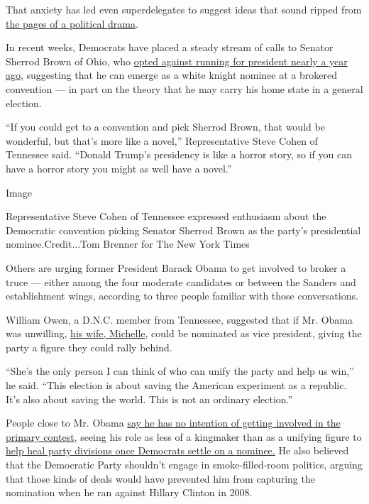 That anxiety has led even superdelegates to suggest ideas that sound
ripped from
\href{https://www.nytimes3xbfgragh.onion/2019/12/29/us/politics/west-wing-politics.html}{the
pages of a political drama}.

In recent weeks, Democrats have placed a steady stream of calls to
Senator Sherrod Brown of Ohio, who
\href{https://www.nytimes3xbfgragh.onion/2019/03/07/us/politics/sherrod-brown-2020-president.html}{opted
against running for president nearly a year ago}, suggesting that he can
emerge as a white knight nominee at a brokered convention --- in part on
the theory that he may carry his home state in a general election.

``If you could get to a convention and pick Sherrod Brown, that would be
wonderful, but that's more like a novel,'' Representative Steve Cohen of
Tennessee said. ``Donald Trump's presidency is like a horror story, so
if you can have a horror story you might as well have a novel.''

Image

Representative Steve Cohen of Tennessee expressed enthusiasm about the
Democratic convention picking Senator Sherrod Brown as the party's
presidential nominee.Credit...Tom Brenner for The New York Times

Others are urging former President Barack Obama to get involved to
broker a truce --- either among the four moderate candidates or between
the Sanders and establishment wings, according to three people familiar
with those conversations.

William Owen, a D.N.C. member from Tennessee, suggested that if Mr.
Obama was unwilling,
\href{https://www.nytimes3xbfgragh.onion/2016/11/06/us/politics/michelle-obama-2016-presidential-election-first-lady.html}{his
wife, Michelle}, could be nominated as vice president, giving the party
a figure they could rally behind.

``She's the only person I can think of who can unify the party and help
us win,'' he said. ``This election is about saving the American
experiment as a republic. It's also about saving the world. This is not
an ordinary election.''

People close to Mr. Obama
\href{https://www.nytimes3xbfgragh.onion/2019/11/21/us/politics/obama-2020-democrats.html}{say
he has no intention of getting involved in the primary contest}, seeing
his role as less of a kingmaker than as a unifying figure to
\href{https://www.nytimes3xbfgragh.onion/2019/11/15/us/politics/barack-obama-2020-dems.html}{help
heal party divisions once Democrats settle on a nominee.} He also
believed that the Democratic Party shouldn't engage in smoke-filled-room
politics, arguing that those kinds of deals would have prevented him
from capturing the nomination when he ran against Hillary Clinton in
2008.


